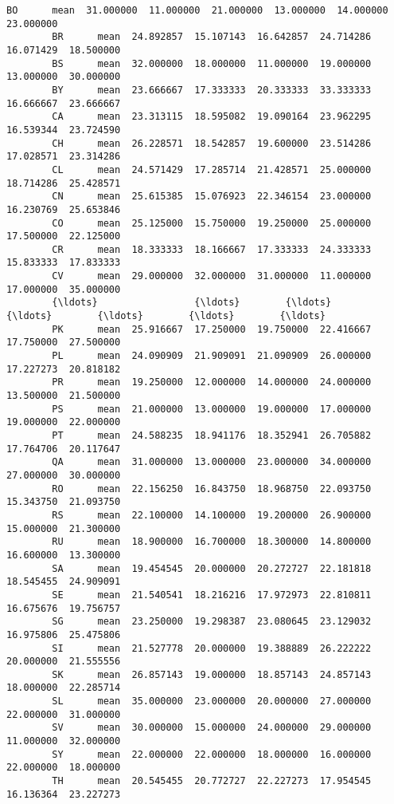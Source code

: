 \documentclass[11pt]{article}
\begin{document}
\begin{Verbatim}[commandchars=\\\{\}]
        BO      mean  31.000000  11.000000  21.000000  13.000000  14.000000  23.000000
        BR      mean  24.892857  15.107143  16.642857  24.714286  16.071429  18.500000
        BS      mean  32.000000  18.000000  11.000000  19.000000  13.000000  30.000000
        BY      mean  23.666667  17.333333  20.333333  33.333333  16.666667  23.666667
        CA      mean  23.313115  18.595082  19.090164  23.962295  16.539344  23.724590
        CH      mean  26.228571  18.542857  19.600000  23.514286  17.028571  23.314286
        CL      mean  24.571429  17.285714  21.428571  25.000000  18.714286  25.428571
        CN      mean  25.615385  15.076923  22.346154  23.000000  16.230769  25.653846
        CO      mean  25.125000  15.750000  19.250000  25.000000  17.500000  22.125000
        CR      mean  18.333333  18.166667  17.333333  24.333333  15.833333  17.833333
        CV      mean  29.000000  32.000000  31.000000  11.000000  17.000000  35.000000
        {\ldots}                 {\ldots}        {\ldots}        {\ldots}        {\ldots}        {\ldots}        {\ldots}
        PK      mean  25.916667  17.250000  19.750000  22.416667  17.750000  27.500000
        PL      mean  24.090909  21.909091  21.090909  26.000000  17.227273  20.818182
        PR      mean  19.250000  12.000000  14.000000  24.000000  13.500000  21.500000
        PS      mean  21.000000  13.000000  19.000000  17.000000  19.000000  22.000000
        PT      mean  24.588235  18.941176  18.352941  26.705882  17.764706  20.117647
        QA      mean  31.000000  13.000000  23.000000  34.000000  27.000000  30.000000
        RO      mean  22.156250  16.843750  18.968750  22.093750  15.343750  21.093750
        RS      mean  22.100000  14.100000  19.200000  26.900000  15.000000  21.300000
        RU      mean  18.900000  16.700000  18.300000  14.800000  16.600000  13.300000
        SA      mean  19.454545  20.000000  20.272727  22.181818  18.545455  24.909091
        SE      mean  21.540541  18.216216  17.972973  22.810811  16.675676  19.756757
        SG      mean  23.250000  19.298387  23.080645  23.129032  16.975806  25.475806
        SI      mean  21.527778  20.000000  19.388889  26.222222  20.000000  21.555556
        SK      mean  26.857143  19.000000  18.857143  24.857143  18.000000  22.285714
        SL      mean  35.000000  23.000000  20.000000  27.000000  22.000000  31.000000
        SV      mean  30.000000  15.000000  24.000000  29.000000  11.000000  32.000000
        SY      mean  22.000000  22.000000  18.000000  16.000000  22.000000  18.000000
        TH      mean  20.545455  20.772727  22.227273  17.954545  16.136364  23.227273

\end{Verbatim}
\end{document}
